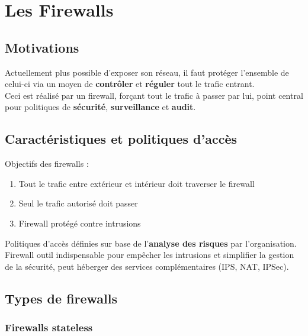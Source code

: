 \documentclass{report}
\begin{document}
\chapter{Les Firewalls}

	\section{Motivations}

		Actuellement plus possible d'exposer son réseau, il faut protéger l'ensemble de celui-ci via un moyen de \textbf{contrôler} et \textbf{réguler} tout le trafic entrant.\\
		Ceci est réalisé par un firewall, forçant tout le trafic à passer par lui, point central pour politiques de \textbf{sécurité}, \textbf{surveillance} et \textbf{audit}.\\

	\section{Caractéristiques et politiques d'accès}

		Objectifs des firewalls : \\
		\begin{enumerate}
			\item Tout le trafic entre extérieur et intérieur doit traverser le firewall
			\item Seul le trafic autorisé doit passer
			\item Firewall protégé contre intrusions\\
		\end{enumerate}

		Politiques d'accès définies sur base de l'\textbf{analyse des risques} par l'organisation.\\

		Firewall outil indispensable pour empêcher les intrusions et simplifier la gestion de la sécurité, peut héberger des services complémentaires (IPS, NAT, IPSec).\\

	\section{Types de firewalls}

		\subsection{Firewalls stateless}
\end{document}
